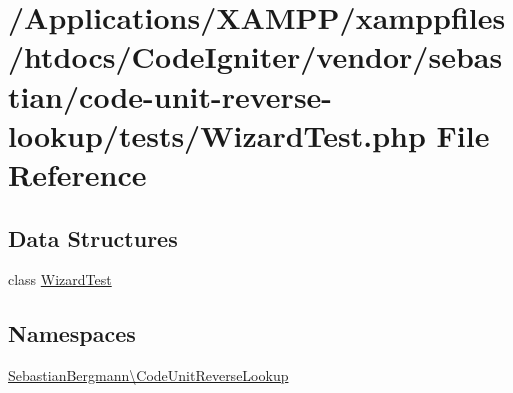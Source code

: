 \hypertarget{_wizard_test_8php}{}\section{/\+Applications/\+X\+A\+M\+P\+P/xamppfiles/htdocs/\+Code\+Igniter/vendor/sebastian/code-\/unit-\/reverse-\/lookup/tests/\+Wizard\+Test.php File Reference}
\label{_wizard_test_8php}
\subsection*{Data Structures}
\begin{DoxyCompactItemize}
\item 
class \mbox{\hyperlink{class_sebastian_bergmann_1_1_code_unit_reverse_lookup_1_1_wizard_test}{Wizard\+Test}}
\end{DoxyCompactItemize}
\subsection*{Namespaces}
\begin{DoxyCompactItemize}
\item 
 \mbox{\hyperlink{namespace_sebastian_bergmann_1_1_code_unit_reverse_lookup}{Sebastian\+Bergmann\textbackslash{}\+Code\+Unit\+Reverse\+Lookup}}
\end{DoxyCompactItemize}
